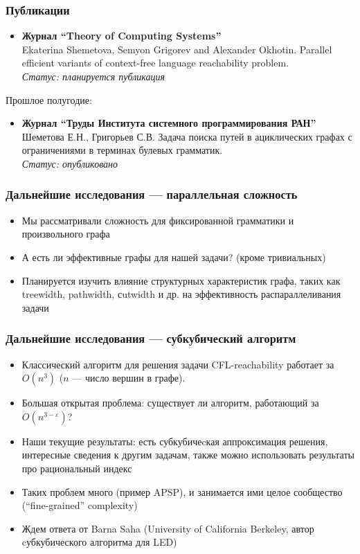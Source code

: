 \documentclass{beamer}
\begin{document}
\begin{frame}
\frametitle{Публикации}
\begin{itemize}
\item \textbf{Журнал ``Theory of Computing Systems''} \\
Ekaterina Shemetova, Semyon Grigorev and Alexander Okhotin. Parallel efficient variants of context-free language reachability problem.
\\\textit{Статус: планируется публикация}
\end{itemize}
Прошлое полугодие: 
\begin{itemize}
\item  \textbf{Журнал ``Труды Института системного программирования РАН''}
\\Шеметова Е.Н., Григорьев С.В. Задача поиска путей в ациклических графах с ограничениями в терминах булевых грамматик. 
\\\textit{Статус: опубликовано}
\end{itemize}

\end{frame}
\begin{frame}
\frametitle{Дальнейшие исследования --- параллельная сложность}
\begin{itemize}
\item Мы рассматривали сложность для фиксированной грамматики и произвольного графа
\item А есть ли эффективные графы для нашей задачи? (кроме тривиальных)
\item Планируется изучить влияние структурных характеристик графа, таких как treewidth, pathwidth, сutwidth и др. на эффективность распараллеливания задачи
\end{itemize}

\end{frame}
\begin{frame}
\frametitle{Дальнейшие исследования --- субкубический алгоритм}
\begin{itemize}
\item Классический алгоритм для решения задачи CFL-reachability работает за $O(n^3)$ ($n$ --- число вершин в графе).
\item Большая открытая проблема: существует ли алгоритм, работающий за $O(n^{3-\varepsilon})$?
\item Наши текущие результаты: есть субкубичеcкая аппроксимация решения, интересные сведения к другим задачам, также можно использовать результаты про рациональный индекс
\item Таких проблем много (пример APSP), и занимается ими целое сообщество (``fine-grained'' complexity)
\item Ждем ответа от Barna Saha (University of California Berkeley, автор cубкубического алгоритма для LED)
\end{itemize}

\end{frame}
\end{document}

